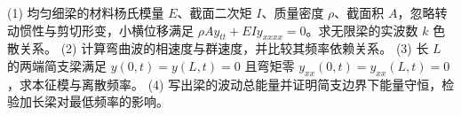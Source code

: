 (1) 均匀细梁的材料杨氏模量 \(E\)、截面二次矩 \(I\)、质量密度 \(\rho\)、截面积 \(A\)，忽略转动惯性与剪切形变，小横位移满足 \(\rho A y_{tt}+EI y_{xxxx}=0\)。求无限梁的实波数 \(k\) 色散关系。
(2) 计算弯曲波的相速度与群速度，并比较其频率依赖关系。
(3) 长 \(L\) 的两端简支梁满足 \(y(0,t)=y(L,t)=0\) 且弯矩零 \(y_{xx}(0,t)=y_{xx}(L,t)=0\)，求本征模与离散频率。
(4) 写出梁的波动总能量并证明简支边界下能量守恒，检验加长梁对最低频率的影响。
